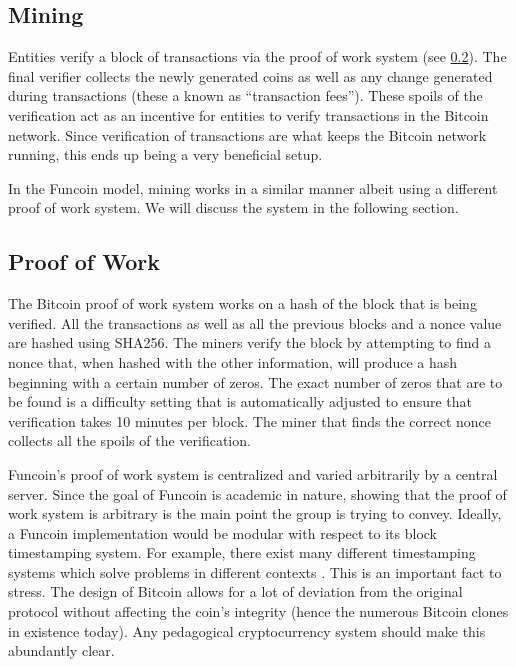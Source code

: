 \documentclass[12pt]{article}
\begin{document}
\subsection{Mining}\label{mining}
Entities verify a block of transactions via the proof of work system (see \ref{proofwork}).
The final verifier collects the newly generated coins as well as any change generated during
transactions (these a known as ``transaction fees''). These spoils of the verification act as an incentive for entities to verify transactions in the Bitcoin network. Since verification of transactions are what keeps the Bitcoin network running, this ends up being a very beneficial setup.

In the Funcoin model, mining works in a similar manner albeit using a different proof of work system. We will discuss the system in the following section.

\subsection{Proof of Work}\label{proofwork}
The Bitcoin proof of work system works on a hash of the block that is being verified. All the transactions as well as all the previous blocks and a nonce value are hashed using SHA256. The miners verify the block by attempting to find a nonce that, when hashed with the other information, will produce a hash beginning with a certain number of zeros. The exact number of zeros that are to be found is a difficulty setting that is automatically adjusted to ensure that verification takes 10 minutes per block. The miner that finds the correct nonce collects all the spoils of the verification.

Funcoin's proof of work system is centralized and varied arbitrarily by a central server. Since the goal of Funcoin is academic in nature, showing that the proof of work system is arbitrary is the main point the group is trying to convey. Ideally, a Funcoin implementation would be modular with respect to its block timestamping system. For example, there exist many different timestamping systems which solve problems in different contexts \cite{github:proofofwork}. This is an important fact to stress. The design of Bitcoin allows for a lot of deviation from the original protocol without affecting the coin's integrity (hence the numerous Bitcoin clones in existence today). Any pedagogical cryptocurrency system should make this abundantly clear.
\end{document}
